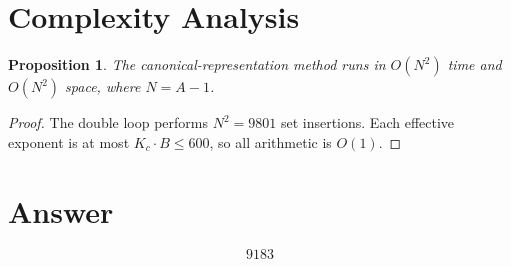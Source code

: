 \documentclass[12pt,a4paper]{article}
\newtheorem{proposition}[theorem]{Proposition}
\theoremstyle{definition}
\begin{document}
\section{Complexity Analysis}

\begin{proposition}
The canonical-representation method runs in $O(N^2)$ time and $O(N^2)$ space, where $N = A - 1$.
\end{proposition}

\begin{proof}
The double loop performs $N^2 = 9801$ set insertions. Each effective exponent is at most $K_c \cdot B \leq 600$, so all arithmetic is $O(1)$.
\end{proof}

\section{Answer}

\[
\boxed{9183}
\]
\end{document}

